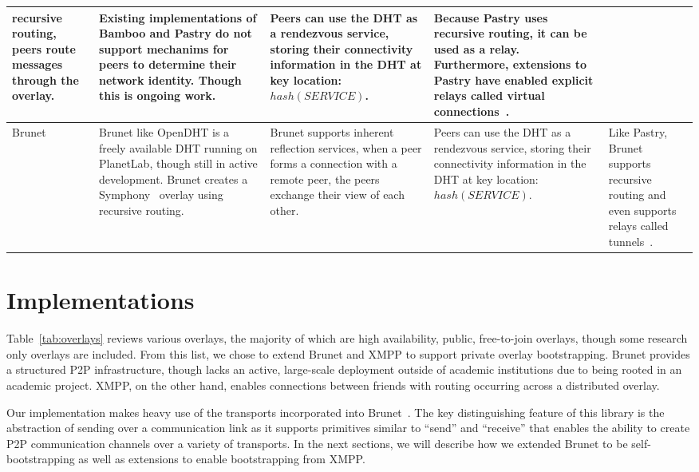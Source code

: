 \documentclass[conference]{IEEEtran}
\begin{document}
\begin{table*}[h!t!]
\begin{tabular}[c]{|m{1.5cm}||m{5.5cm}|m{3cm}|m{3cm}|m{3cm}|}
recursive routing, peers route messages through the overlay.
&
Existing implementations of Bamboo and Pastry do not support mechanims for
peers to determine their network identity.  Though this is ongoing work.
&
Peers can use the DHT as a rendezvous service, storing their connectivity
information in the DHT at key location:  $hash(SERVICE)$.
&
Because Pastry uses recursive routing, it can be used as a relay.  Furthermore,
extensions to Pastry have enabled explicit relays called virtual
connections~\cite{epost}.
\\ \hline
Brunet~\cite{brunet} &
Brunet like OpenDHT is a freely available DHT running on PlanetLab, though
still in active development.  Brunet creates a Symphony~\cite{symphony} overlay
using recursive routing.
&
Brunet supports inherent reflection services, when a peer forms a connection
with a remote peer, the peers exchange their view of each other.
&
Peers can use the DHT as a rendezvous service, storing their connectivity
information in the DHT at key location:  $hash(SERVICE)$.
&
Like Pastry, Brunet supports recursive routing and even supports relays called
tunnels~\cite{hpdc08_0}.
\\ \hline
\end{tabular}
\caption{Public and Research Overlays}
\label{tab:overlays}
\end{table*}

\section{Implementations}
\label{implementation}

Table~\ref{tab:overlays} reviews various overlays, the majority of which are
high availability, public, free-to-join overlays, though some research only
overlays are included.  From this list, we chose to extend Brunet and XMPP to
support private overlay bootstrapping.  Brunet provides a structured P2P
infrastructure, though lacks an active, large-scale deployment outside of
academic institutions due to being rooted in an academic project.  XMPP, on the
other hand, enables connections between friends with routing occurring across a
distributed overlay.

Our implementation makes heavy use of the transports incorporated into
Brunet~\cite{brunet}.  The key distinguishing feature of this library is the
abstraction of sending over a communication link as it supports primitives
similar to ``send'' and ``receive'' that enables the ability to create P2P
communication channels over a variety of transports.  In the next sections, we
will describe how we extended Brunet to be self-bootstrapping as well as
extensions to enable bootstrapping from XMPP.
\end{document}
